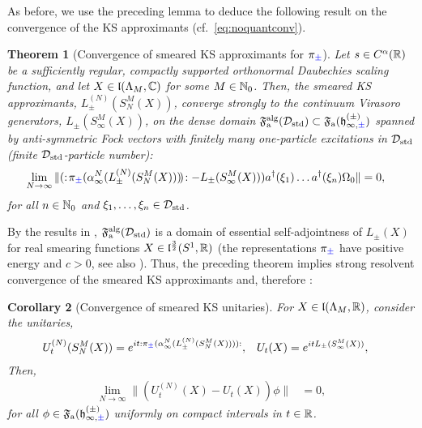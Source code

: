 \documentclass[a4paper, 11pt]{article}
\newcommand{\ua}{\textup a}
\newcommand{\fF}{\mathfrak{F}}\newcommand{\cF}{\mathcal{F}}\newcommand{\dF}{\mathds{F}}\newcommand{\sF}{\mathscr{F}}
\newcommand{\fh}{\mathfrak{h}}
\newcommand{\fl}{\mathfrak{l}}\newcommand{\cl}{\mathcal{l}}
\DeclareMathOperator{\1}{\mathds{1}}
\DeclareMathOperator{\std}{std}
\DeclareMathOperator{\alg}{alg}
\newtheorem{thm}{Theorem} [section]
\newtheorem{cor}[thm]{Corollary}
\begin{document}
As before, we use the preceding lemma to deduce the following result on the convergence of the KS approximants (cf.~\eqref{eq:noquantconv}).
\begin{thm}[Convergence of smeared KS approximants for $\pi_{{\color{blue}\pm}}$]
\label{thm:KSconvsmeared}
Let $s\in C^{\alpha}(\mathbb{R})$ be a sufficiently regular, compactly supported orthonormal Daubechies scaling function, and let $X\in\fl(\Lambda_{M},\C)$ for some $M\in\mathbb{N}_{0}$. Then, the smeared KS approximants, $L^{(N)}_{\pm}(S^{M}_{N}(X))$, converge strongly to the continuum Virasoro generators, $L_{\pm}(S^{M}_{\infty}(X))$, on the dense domain $\fF^{\alg}_{\ua}(\cD_{\std})\subset\fF_{\ua}(\fh^{(\pm)}_{\infty,{\color{blue}\pm}})$ spanned by anti-symmetric Fock vectors with finitely many one-particle excitations in $\cD_{\std}$ (finite $\cD_{\std}$-particle number):
\begin{align}
\label{eq:latviraconvsmeared}
\lim_{N\rightarrow\infty}\|(:\!\pi_{{\color{blue}\pm}}(\alpha^{N}_{\infty}(L^{(N)}_{\pm}(S^{M}_{N}(X)))\!)\!: - L_{\pm}(S^{M}_{\infty}(X)))a^{\dagger}(\xi_{1})\dots a^{\dagger}(\xi_{n})\Omega_{0}\| & = 0,
\end{align}
for all $n\in\mathbb{N}_{0}$ and $\xi_{1},\dots,\xi_{n}\in\cD_{\std}$.
\end{thm}
By the results in \cite{CarpiOnTheUniqueness}, $\fF^{\alg}_{\ua}(\cD_{\std})$ is a domain of essential self-adjointness of $L_{\pm}(X)$ for real smearing functions $X\in\fl^{\frac{3}{2}}(S^{1},\R)$ (the representations $\pi_{{\color{blue}\pm}}$ have positive energy and $c>0$, see also \cite{GoodmanProjectiveUnitaryPositive}). Thus, the preceding theorem implies strong resolvent convergence of the smeared KS approximants and, therefore \cite{ReedMethodsOfModern1}:
\begin{cor}[Convergence of smeared KS unitaries]
\label{cor:KSconvsmeared}
For $X\in\fl(\Lambda_{M},\R)$, consider the unitaries,
\begin{align*}
U^{(N)}_{t}(S^{M}_{N}(X)) & = e^{it:\pi_{{\color{blue}\pm}}(\alpha^{N}_{\infty}(L^{(N)}_{\pm}(S^{M}_{N}(X)))):}, & U_{t}(X) & = e^{itL_{\pm}(S^{M}_{\infty}(X))},
\end{align*}
Then,
\begin{align*}
\lim_{N\rightarrow\infty}\|(U^{(N)}_{t}(X)-U_{t}(X))\phi\| & = 0,
\end{align*}
for all $\phi\in\fF_{\ua}(\fh^{(\pm)}_{\infty,{\color{blue}\pm}})$ uniformly on compact intervals in $t\in\mathbb{R}$.
\end{cor}
\end{document}
